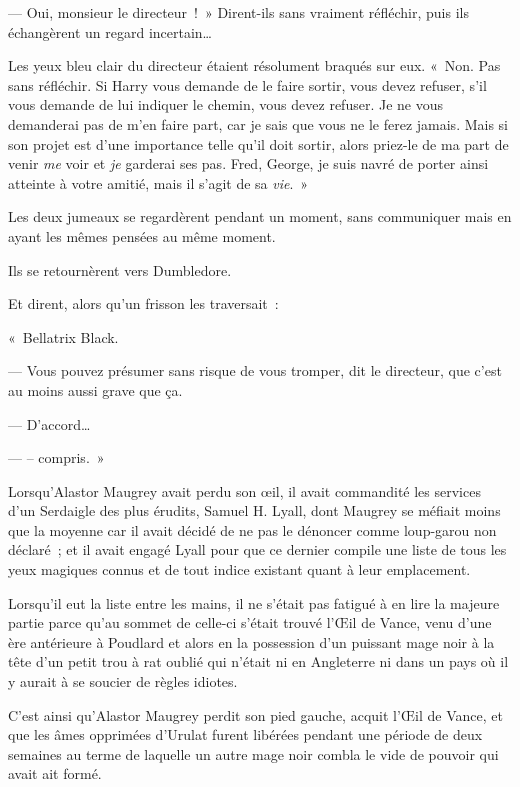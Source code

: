 --- Oui, monsieur le directeur~!~»
Dirent-ils sans vraiment réfléchir, puis ils échangèrent un regard incertain…

Les yeux bleu clair du directeur étaient résolument braqués sur eux.
«~Non. Pas sans réfléchir.
Si Harry vous demande de le faire sortir, vous devez refuser, s'il vous demande de lui indiquer le chemin, vous devez refuser.
Je ne vous demanderai pas de m'en faire part, car je sais que vous ne le ferez jamais.
Mais si son projet est d'une importance telle qu'il doit sortir, alors priez-le de ma part de venir \emph{me} voir et \emph{je} garderai ses pas.
Fred, George, je suis navré de porter ainsi atteinte à votre amitié, mais il s'agit de sa \emph{vie}.~»

Les deux jumeaux se regardèrent pendant un moment, sans communiquer mais en ayant les mêmes pensées au même moment.

Ils se retournèrent vers Dumbledore.

Et dirent, alors qu'un frisson les traversait~:

«~Bellatrix Black.

--- Vous pouvez présumer sans risque de vous tromper, dit le directeur, que c'est au moins aussi grave que ça.

--- D'accord…

--- -- compris.~»


Lorsqu'Alastor Maugrey avait perdu son œil, il avait commandité les services d'un Serdaigle des plus érudits, Samuel H.
Lyall, dont Maugrey se méfiait moins que la moyenne car il avait décidé de ne pas le dénoncer comme loup-garou non déclaré~; et il avait engagé Lyall pour que ce dernier compile une liste de tous les yeux magiques connus et de tout indice existant quant à leur emplacement.

Lorsqu'il eut la liste entre les mains, il ne s'était pas fatigué à en lire la majeure partie parce qu'au sommet de celle-ci s'était trouvé l'Œil de Vance, venu d'une ère antérieure à Poudlard et alors en la possession d'un puissant mage noir à la tête d'un petit trou à rat oublié qui n'était ni en Angleterre ni dans un pays où il y aurait à se soucier de règles idiotes.

C'est ainsi qu'Alastor Maugrey perdit son pied gauche, acquit l'Œil de Vance, et que les âmes opprimées d'Urulat furent libérées pendant une période de deux semaines au terme de laquelle un autre mage noir combla le vide de pouvoir qui avait ait formé.


